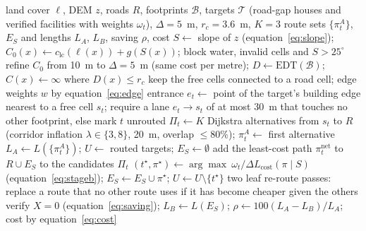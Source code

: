 \documentclass[preprint,12pt]{elsarticle}
\newcommand{\Lcost}{L_{\mathrm{cost}}}
\begin{document}
\begin{algorithm}[htbp]
\footnotesize
\caption{Cost surface with zero-crossing clearance and two-stage routing (\texttt{clearance.py}, \texttt{plan\_network\_v2.py})}
\label{alg:route}
\begin{algorithmic}[1]
\Require land cover $\ell$, DEM $z$, roads $R$, footprints $\mathcal B$, targets $\mathcal T$ (road-gap houses and verified facilities with weights $\omega_t$), $\Delta=5$~m, $r_c=3.6$~m, $K=3$
\Ensure route sets $\{\pi_t^A\}$, $E_S$ and lengths $L_A$, $L_B$, saving $\rho$, cost
\State $S\gets$ slope of $z$ (equation~\ref{eq:slope}); $C_0(x)\gets c_{\mathrm{lc}}(\ell(x))+g(S(x))$; block water, invalid cells and $S>25^{\circ}$
\State refine $C_0$ from 10~m to $\Delta=5$~m (same cost per metre); $D\gets\mathrm{EDT}(\mathcal B)$; $C(x)\gets\infty$ where $D(x)\le r_c$
\State keep the free cells connected to a road cell; edge weights $w$ by equation~\ref{eq:edge}
  \State entrance $e_t\gets$ point of the target's building edge nearest to a free cell $s_t$; require a lane $e_t\to s_t$ of at most 30~m that touches no other footprint, else mark $t$ unrouted
  \State $\Pi_t\gets K$ Dijkstra alternatives from $s_t$ to $R$ (corridor inflation $\lambda\in\{3,8\}$, 20~m, overlap $\le 80\%$); $\pi_t^A\gets$ first alternative
\EndFor
\State $L_A\gets L(\{\pi_t^A\})$; $U\gets$ routed targets; $E_S\gets\emptyset$
   add the least-cost path $\pi_t^{\mathrm{net}}$ to $R\cup E_S$ to the candidates $\Pi_t$ \EndFor
  \State $(t^\star,\pi^\star)\gets\arg\max\ \omega_t/\Delta\Lcost(\pi\mid S)$ (equation~\ref{eq:stageb}); $E_S\gets E_S\cup\pi^\star$; $U\gets U\setminus\{t^\star\}$
\EndWhile
\State two leaf re-route passes: replace a route that no other route uses if it has become cheaper given the others
\State verify $X=0$ (equation~\ref{eq:saving}); $L_B\gets L(E_S)$; $\rho\gets 100(L_A-L_B)/L_A$; cost by equation~\ref{eq:cost}
\end{algorithmic}
\end{algorithm}
\end{document}
